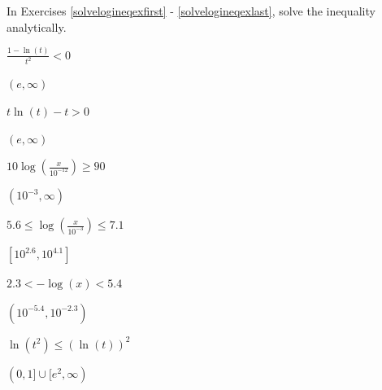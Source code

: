 \documentclass{ximera}
\begin{document}
\begin{question}

In Exercises \ref{solvelogineqexfirst} - \ref{solvelogineqexlast}, solve the inequality analytically.

\begin{problem}\label{solvelogineqexfirst}
$\frac{1 - \ln(t)}{t^{2}} < 0$ 

\begin{solution}
$(e, \infty)$
\end{solution}
\end{problem} 

\begin{problem}
$t\ln(t) - t > 0$

\begin{solution}
$(e, \infty)$
\end{solution}
\end{problem} 

\begin{problem}\label{sixfourdecibelineq}
$10\log\left(\frac{x}{10^{-12}}\right) \geq 90$    

\begin{solution}
$(10^{-3}, \infty)$
\end{solution}
\end{problem} 

\begin{problem}\label{sixfourRichterineq}
$5.6 \leq \log\left(\frac{x}{10^{-3}}\right) \leq 7.1$ 

\begin{solution}
$\left[10^{2.6}, 10^{4.1}\right]$
\end{solution}
\end{problem}

\begin{problem}\label{sixfourpHineq} 
$2.3 < -\log(x) < 5.4$ 

\begin{solution}
$\left(10^{-5.4}, 10^{-2.3}\right)$
\end{solution}
\end{problem}

\begin{problem}\label{solvelogineqexlast}
$\ln(t^{2}) \leq (\ln(t))^{2}$

\begin{solution}
$(0, 1] \cup [e^{2}, \infty)$
\end{solution}
\end{problem}

\end{question}
\end{document}
